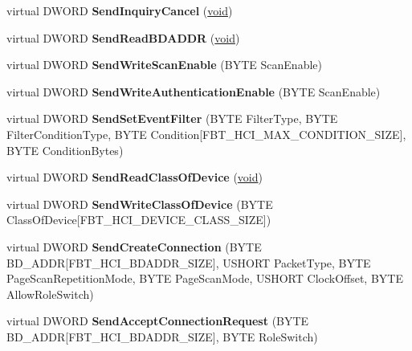 \begin{DoxyCompactItemize}
virtual D\+W\+O\+RD {\bfseries Send\+Inquiry\+Cancel} (\hyperlink{interfacevoid}{void})
\item 
\mbox{\label{class_c_hci_a0105cfc4545188e61515d8c2c5ba8b98}} 
virtual D\+W\+O\+RD {\bfseries Send\+Read\+B\+D\+A\+D\+DR} (\hyperlink{interfacevoid}{void})
\item 
\mbox{\label{class_c_hci_a87c8ccae16cce2fe484274a0510e4858}} 
virtual D\+W\+O\+RD {\bfseries Send\+Write\+Scan\+Enable} (B\+Y\+TE Scan\+Enable)
\item 
\mbox{\label{class_c_hci_ab0d81d11ba7c55b1ac051e5f4662e09a}} 
virtual D\+W\+O\+RD {\bfseries Send\+Write\+Authentication\+Enable} (B\+Y\+TE Scan\+Enable)
\item 
\mbox{\label{class_c_hci_a9f0bce59a383e7af633e76c3be00a88c}} 
virtual D\+W\+O\+RD {\bfseries Send\+Set\+Event\+Filter} (B\+Y\+TE Filter\+Type, B\+Y\+TE Filter\+Condition\+Type, B\+Y\+TE Condition\mbox{[}F\+B\+T\+\_\+\+H\+C\+I\+\_\+\+M\+A\+X\+\_\+\+C\+O\+N\+D\+I\+T\+I\+O\+N\+\_\+\+S\+I\+ZE\mbox{]}, B\+Y\+TE Condition\+Bytes)
\item 
\mbox{\label{class_c_hci_afb82a50bc94f3d8c61ce68541d6b57e8}} 
virtual D\+W\+O\+RD {\bfseries Send\+Read\+Class\+Of\+Device} (\hyperlink{interfacevoid}{void})
\item 
\mbox{\label{class_c_hci_a91649719e6044574f412b279adb2e73b}} 
virtual D\+W\+O\+RD {\bfseries Send\+Write\+Class\+Of\+Device} (B\+Y\+TE Class\+Of\+Device\mbox{[}F\+B\+T\+\_\+\+H\+C\+I\+\_\+\+D\+E\+V\+I\+C\+E\+\_\+\+C\+L\+A\+S\+S\+\_\+\+S\+I\+ZE\mbox{]})
\item 
\mbox{\label{class_c_hci_a32047f95127df67529fc13ea9e1d3192}} 
virtual D\+W\+O\+RD {\bfseries Send\+Create\+Connection} (B\+Y\+TE B\+D\+\_\+\+A\+D\+DR\mbox{[}F\+B\+T\+\_\+\+H\+C\+I\+\_\+\+B\+D\+A\+D\+D\+R\+\_\+\+S\+I\+ZE\mbox{]}, U\+S\+H\+O\+RT Packet\+Type, B\+Y\+TE Page\+Scan\+Repetition\+Mode, B\+Y\+TE Page\+Scan\+Mode, U\+S\+H\+O\+RT Clock\+Offset, B\+Y\+TE Allow\+Role\+Switch)
\item 
\mbox{\label{class_c_hci_a4d22d0264d21745a92bc5b5665f5c426}} 
virtual D\+W\+O\+RD {\bfseries Send\+Accept\+Connection\+Request} (B\+Y\+TE B\+D\+\_\+\+A\+D\+DR\mbox{[}F\+B\+T\+\_\+\+H\+C\+I\+\_\+\+B\+D\+A\+D\+D\+R\+\_\+\+S\+I\+ZE\mbox{]}, B\+Y\+TE Role\+Switch)

\end{DoxyCompactItemize}

